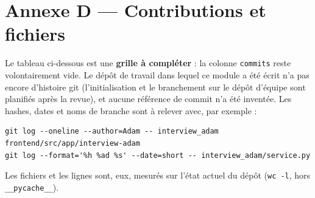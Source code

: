 \section{Annexe D --- Contributions et fichiers}
\label{sec:contrib}

Le tableau ci-dessous est une \textbf{grille à compléter} : la colonne
\texttt{commits} reste volontairement vide. Le dépôt de travail dans lequel ce
module a été écrit n'a pas encore d'histoire git (l'initialisation et le branchement
sur le dépôt d'équipe sont planifiés après la revue), et aucune référence de commit
n'a été inventée. Les hashes, dates et noms de branche sont à relever avec, par
exemple :

\begin{lstlisting}[style=adamshell]
git log --oneline --author=Adam -- interview_adam frontend/src/app/interview-adam
git log --format='%h %ad %s' --date=short -- interview_adam/service.py
\end{lstlisting}

Les fichiers et les lignes sont, eux, mesurés sur l'état actuel du dépôt
(\texttt{wc -l}, hors \texttt{\_\_pycache\_\_}).

